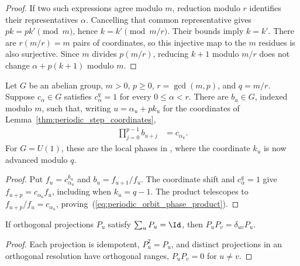 \begin{proof}
    \leanok
    If two such expressions agree modulo $m$, reduction modulo $r$
    identifies their representatives $\alpha$. Cancelling that common
    representative gives $pk=pk'\pmod m$, hence $k=k'\pmod{m/r}$.
    Their bounds imply $k=k'$. There are $r(m/r)=m$ pairs of coordinates,
    so this injective map to the $m$ residues is also surjective.
    Since $m$ divides $p(m/r)$, reducing $k+1$ modulo $m/r$ does not
    change $\alpha+p(k+1)$ modulo $m$.
\end{proof}

\begin{lemma}
    \label{thm:periodic_orbit_phase_products}
    \leanok
    Let $G$ be an abelian group, $m>0$, $p\ge0$, $r=\gcd(m,p)$,
    and $q=m/r$. Suppose $c_\alpha\in G$ satisfies $c_\alpha^q=1$
    for every $0\le\alpha<r$. There are $b_u\in G$, indexed modulo
    $m$, such that, writing $u=\alpha_u+pk_u$ for the coordinates of
    Lemma~\ref{thm:periodic_step_coordinates},
    \begin{align}
        \prod_{j=0}^{p-1}b_{u+j} & = c_{\alpha_u}.
        \label{eq:periodic_orbit_phase_product}
    \end{align}
    For $G=U(1)$, these are the local phases in
    \cite[proof of Theorem~4.1]{DeLasCuevas2017Irreducible}, where the
    coordinate $k_u$ is now advanced modulo $q$.
\end{lemma}

\begin{proof}
    \leanok
    Put $f_u=c_{\alpha_u}^{k_u}$ and $b_u=f_{u+1}/f_u$.
    The coordinate shift and $c_\alpha^q=1$ give
    $f_{u+p}=c_{\alpha_u}f_u$, including when $k_u=q-1$.
    The product telescopes to $f_{u+p}/f_u=c_{\alpha_u}$,
    proving~(\ref{eq:periodic_orbit_phase_product}).
\end{proof}

\begin{lemma}
    \label{thm:periodic_orthogonal_resolution_multiplication}
    \leanok
    If orthogonal projections $P_u$ satisfy $\sum_u P_u=\Id$, then
    $P_uP_v=\delta_{uv}P_u$.
\end{lemma}

\begin{proof}
    \leanok
    Each projection is idempotent, $P_u^2=P_u$, and distinct projections in an
    orthogonal resolution have orthogonal ranges, $P_uP_v=0$ for $u\ne v$.
\end{proof}

